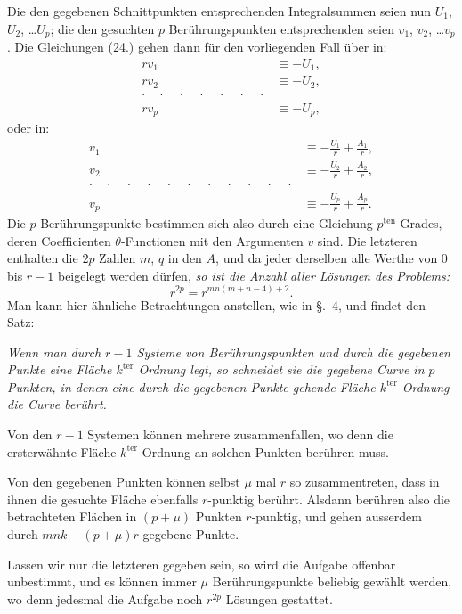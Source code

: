 \documentclass{article}
\begin{document}
Die den gegebenen Schnittpunkten entsprechenden Integralsummen seien nun $U_{1}$, $U_{2}$, \ldots $U_{p}$; die den gesuchten $p$ Berührungspunkten entsprechenden seien $v_{1}$, $v_{2}$, \ldots $v_{p}$. Die Gleichungen (24.) gehen dann für den vorliegenden Fall über in:
\[
\begin{aligned}
rv_{1} &\equiv -U_{1},\\
rv_{2} &\equiv -U_{2},\\
\cdot\quad\cdot\quad\cdot\quad\cdot\quad\cdot\quad\cdot\quad\cdot &\\
rv_{p} &\equiv -U_{p},
\end{aligned}
\]
oder in:
\[
\begin{aligned}
v_{1} &\equiv -\frac{U_{1}}{r}+\frac{A_{1}}{r},\\
v_{2} &\equiv -\frac{U_{2}}{r}+\frac{A_{2}}{r},\\
\cdot\quad\cdot\quad\cdot\quad\cdot\quad\cdot\quad\cdot\quad\cdot\quad\cdot\quad\cdot\quad\cdot\quad\cdot &\\
v_{p} &\equiv -\frac{U_{p}}{r}+\frac{A_{p}}{r}.
\end{aligned}
\]
Die $p$ Berührungspunkte bestimmen sich also durch eine Gleichung $p^{\text{ten}}$ Grades, deren Coefficienten $\theta$-Functionen mit den Argumenten $v$ sind. Die letzteren enthalten die $2p$ Zahlen $m$, $q$ in den $A$, und da jeder derselben alle Werthe von 0 bis $r-1$ beigelegt werden dürfen, \emph{so ist die Anzahl aller Lösungen des Problems:}
\[
r^{2p} = r^{mn(m+n-4)+2}.
\]
Man kann hier ähnliche Betrachtungen anstellen, wie in §.~4, und findet den Satz:

\emph{Wenn man durch $r-1$ Systeme von Berührungspunkten und durch die gegebenen Punkte eine Fläche $k^{\text{ter}}$ Ordnung legt, so schneidet sie die gegebene Curve in $p$ Punkten, in denen eine durch die gegebenen Punkte gehende Fläche $k^{\text{ter}}$ Ordnung die Curve berührt.}


Von den $r-1$ Systemen können mehrere zusammenfallen, wo denn die ersterwähnte Fläche $k^{\text{ter}}$ Ordnung an solchen Punkten berühren muss.

Von den gegebenen Punkten können selbst $\mu$ mal $r$ so zusammentreten, dass in ihnen die gesuchte Fläche ebenfalls $r$-punktig berührt. Alsdann berühren also die betrachteten Flächen in $(p+\mu)$ Punkten $r$-punktig, und gehen ausserdem durch $mnk-(p+\mu)r$ gegebene Punkte.

Lassen wir nur die letzteren gegeben sein, so wird die Aufgabe offenbar unbestimmt, und es können immer $\mu$ Berührungspunkte beliebig gewählt werden, wo denn jedesmal die Aufgabe noch $r^{2p}$ Lösungen gestattet.
\end{document}
